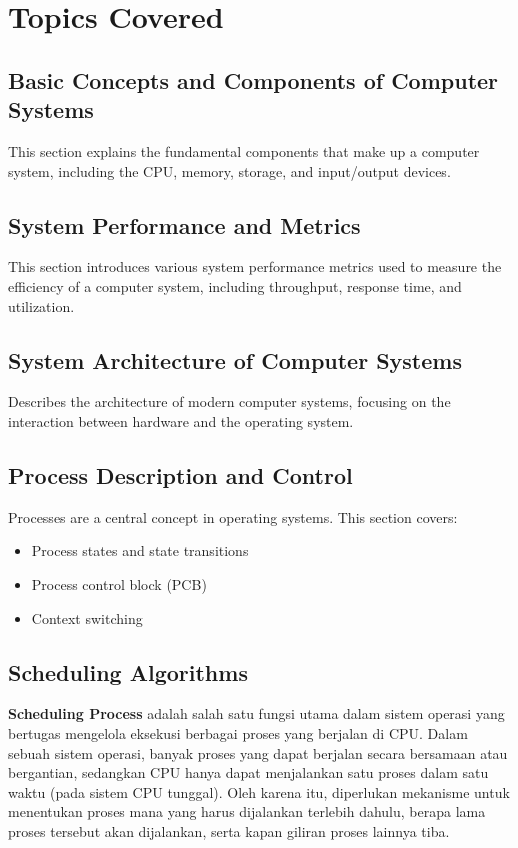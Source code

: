 \documentclass[12pt]{article}
\begin{document}
\section{Topics Covered}

\subsection{Basic Concepts and Components of Computer Systems}
This section explains the fundamental components that make up a computer system, including the CPU, memory, storage, and input/output devices.

\subsection{System Performance and Metrics}
This section introduces various system performance metrics used to measure the efficiency of a computer system, including throughput, response time, and utilization.

\subsection{System Architecture of Computer Systems}
Describes the architecture of modern computer systems, focusing on the interaction between hardware and the operating system.

\subsection{Process Description and Control}
Processes are a central concept in operating systems. This section covers:
\begin{itemize}
    \item Process states and state transitions
    \item Process control block (PCB)
    \item Context switching
\end{itemize}

\subsection{Scheduling Algorithms}

\hspace{1cm}
\textbf{Scheduling Process} adalah salah satu fungsi utama dalam sistem operasi yang bertugas mengelola eksekusi berbagai proses yang berjalan di CPU. Dalam sebuah sistem operasi, banyak proses yang dapat berjalan secara bersamaan atau bergantian, sedangkan CPU hanya dapat menjalankan satu proses dalam satu waktu (pada sistem CPU tunggal). Oleh karena itu, diperlukan mekanisme untuk menentukan proses mana yang harus dijalankan terlebih dahulu, berapa lama proses tersebut akan dijalankan, serta kapan giliran proses lainnya tiba.
\end{document}
